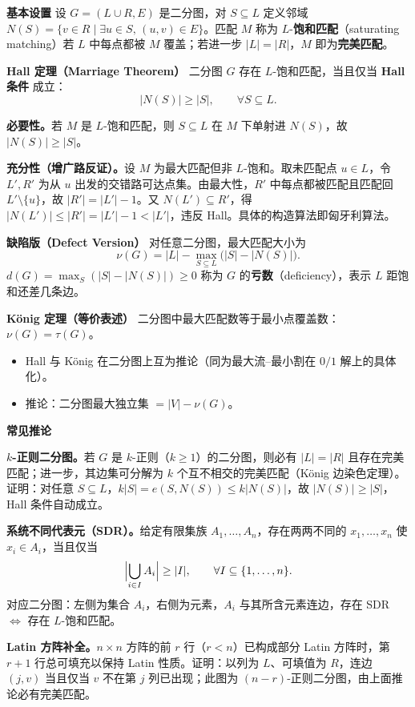 \textbf{基本设置}
设 $G=(L\cup R, E)$ 是二分图，对 $S\subseteq L$ 定义邻域 $N(S)=\{v\in R\mid \exists u\in S,\,(u,v)\in E\}$。匹配 $M$ 称为 $L$-\textbf{饱和匹配}（saturating matching）若 $L$ 中每点都被 $M$ 覆盖；若进一步 $|L|=|R|$，$M$ 即为\textbf{完美匹配}。

\textbf{Hall 定理（Marriage Theorem）}
二分图 $G$ 存在 $L$-饱和匹配，当且仅当 \textbf{Hall 条件} 成立：
\[
|N(S)|\ge |S|,\qquad \forall S\subseteq L.
\]

\textbf{必要性。}若 $M$ 是 $L$-饱和匹配，则 $S\subseteq L$ 在 $M$ 下单射进 $N(S)$，故 $|N(S)|\ge |S|$。

\textbf{充分性（增广路反证）。}设 $M$ 为最大匹配但非 $L$-饱和。取未匹配点 $u\in L$，令 $L',R'$ 为从 $u$ 出发的交错路可达点集。由最大性，$R'$ 中每点都被匹配且匹配回 $L'\setminus\{u\}$，故 $|R'|=|L'|-1$。又 $N(L')\subseteq R'$，得 $|N(L')|\le |R'|=|L'|-1<|L'|$，违反 Hall。具体的构造算法即匈牙利算法。

\textbf{缺陷版（Defect Version）}
对任意二分图，最大匹配大小为
\[
\nu(G)=|L|-\max_{S\subseteq L}\bigl(|S|-|N(S)|\bigr).
\]
$d(G)=\max_{S}(|S|-|N(S)|)\ge 0$ 称为 $G$ 的\textbf{亏数}（deficiency），表示 $L$ 距饱和还差几条边。

\textbf{König 定理（等价表述）}
二分图中最大匹配数等于最小点覆盖数：$\nu(G)=\tau(G)$。
\begin{itemize}
\item Hall 与 König 在二分图上互为推论（同为最大流–最小割在 $0/1$ 解上的具体化）。
\item 推论：二分图最大独立集 $=|V|-\nu(G)$。
\end{itemize}

\textbf{常见推论}

\textbf{$k$-正则二分图。}若 $G$ 是 $k$-正则（$k\ge 1$）的二分图，则必有 $|L|=|R|$ 且存在完美匹配；进一步，其边集可分解为 $k$ 个互不相交的完美匹配（König 边染色定理）。证明：对任意 $S\subseteq L$，$k|S|=e(S,N(S))\le k|N(S)|$，故 $|N(S)|\ge|S|$，Hall 条件自动成立。

\textbf{系统不同代表元（SDR）。}给定有限集族 $A_1,\dots,A_n$，存在两两不同的 $x_1,\dots,x_n$ 使 $x_i\in A_i$，当且仅当
\[
\Bigl|\bigcup_{i\in I}A_i\Bigr|\ge |I|,\qquad \forall I\subseteq\{1,\dots,n\}.
\]
对应二分图：左侧为集合 $A_i$，右侧为元素，$A_i$ 与其所含元素连边，存在 SDR $\iff$ 存在 $L$-饱和匹配。

\textbf{Latin 方阵补全。}$n\times n$ 方阵的前 $r$ 行（$r<n$）已构成部分 Latin 方阵时，第 $r+1$ 行总可填充以保持 Latin 性质。证明：以列为 $L$、可填值为 $R$，连边 $(j,v)$ 当且仅当 $v$ 不在第 $j$ 列已出现；此图为 $(n-r)$-正则二分图，由上面推论必有完美匹配。


